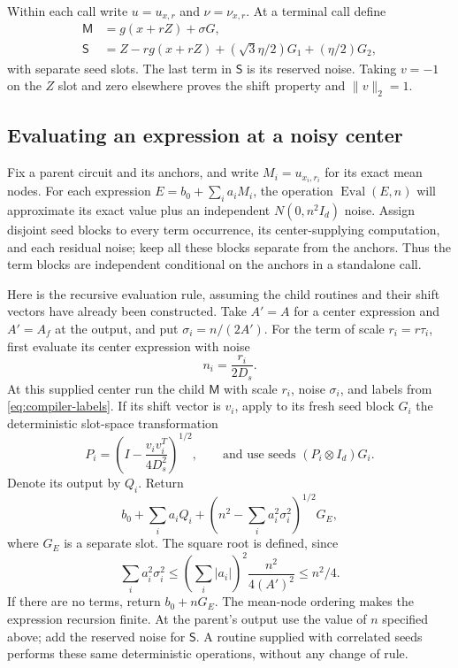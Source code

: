 Within each call write $u=u_{x,r}$ and $\nu=\nu_{x,r}$.
At a terminal call define
\begin{align*}
 \mathsf M&=g(x+rZ)+\sigma G,\\
 \mathsf S&=Z-rg(x+rZ)+(\sqrt3\eta/2)G_1+(\eta/2)G_2,
\end{align*}
with separate seed slots.  The last term in $\mathsf S$ is its
reserved noise.  Taking $v=-1$ on the $Z$ slot and zero elsewhere
proves the shift property and $\|v\|_2=1$.



\subsection{Evaluating an expression at a noisy center}

Fix a parent circuit and its anchors, and write $M_i=u_{x_i,r_i}$
for its exact mean nodes.  For each expression
$E=b_0+\sum_i a_iM_i$, the operation $\operatorname{Eval}(E,n)$
will approximate its exact value plus an independent
$N(0,n^2I_d)$ noise.  Assign disjoint seed blocks to every term
occurrence, its center-supplying computation, and each residual noise;
keep all these blocks separate from the anchors.  Thus the term
blocks are independent conditional on the anchors in a standalone
call.

Here is the recursive evaluation rule, assuming the child routines
and their shift vectors have already been constructed.  Take $A'=A$
for a center expression and $A'=A_f$ at the output, and put
$\sigma_i=n/(2A')$.  For the term of scale $r_i=r\tau_i$, first
evaluate its center expression with noise
\begin{equation}
 n_i=\frac{r_i}{2D_s}.
 \label{eq:compiler-center-noise}
\end{equation}
At this supplied center run the child $\mathsf M$ with scale $r_i$,
noise $\sigma_i$, and labels from \eqref{eq:compiler-labels}.
If its shift vector is $v_i$, apply to its fresh seed block $G_i$
the deterministic slot-space transformation
\begin{equation}
 P_i=\left(I-\frac{v_iv_i^T}{4D_s^2}\right)^{1/2},
 \qquad\text{and use seeds }(P_i\otimes I_d)G_i.
 \label{eq:compiler-seed-transform}
\end{equation}
Denote its output by $Q_i$.  Return
\begin{equation}
 b_0+\sum_i a_iQ_i+
 \left(n^2-\sum_i a_i^2\sigma_i^2\right)^{1/2}G_E,
 \label{eq:compiler-eval}
\end{equation}
where $G_E$ is a separate slot.  The square root is defined, since
\[
 \sum_i a_i^2\sigma_i^2
 \le\left(\sum_i|a_i|\right)^2\frac{n^2}{4(A')^2}
 \le n^2/4.
\]
If there are no terms, return $b_0+nG_E$.  The mean-node ordering
makes the expression recursion finite.  At the parent's output use
the value of $n$ specified above; add the reserved noise for
$\mathsf S$.  A routine supplied with correlated seeds performs
these same deterministic operations, without any change of rule.


